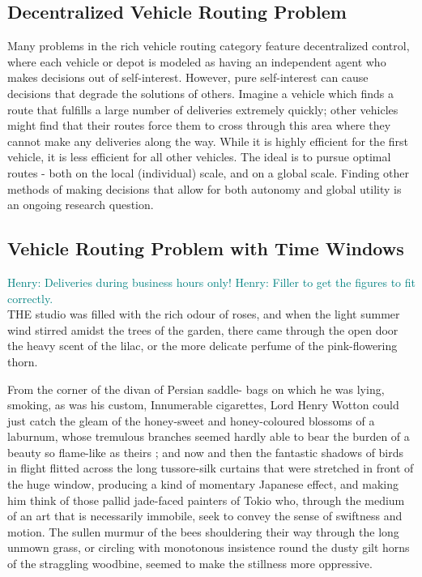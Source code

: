 \documentclass{sig-alternate}
\newcommand{\allcomments}[1]{{#1}}
\newcommand{\hfcomment}[1]{\textcolor{Teal}{\allcomments{Henry: {#1}}}}
\begin{document}
{\subsection{Decentralized Vehicle Routing Problem}
Many problems in the rich vehicle routing category feature decentralized control\cite{Caceres-Cruz:2014}, where each vehicle or depot is modeled as having an independent agent who makes decisions out of self-interest. However, pure self-interest can cause decisions that degrade the solutions of others. Imagine a vehicle which finds a route that fulfills a large number of deliveries extremely quickly; other vehicles might find that their routes force them to cross through this area where they cannot make any deliveries along the way. While it is highly efficient for the first vehicle, it is less efficient for all other vehicles. The ideal is to pursue optimal routes - both on the local (individual) scale, and on a global scale. Finding other methods of making decisions that allow for both autonomy and global utility is an ongoing research question. 
\subsection{Vehicle Routing Problem with Time Windows}
\hfcomment{Deliveries during business hours only!}
\hfcomment{Filler to get the figures to fit correctly.}\\
THE studio was filled with the rich odour of roses, 
and when the light summer wind stirred amidst 
the trees of the garden, there came through the open 
door the heavy scent of the lilac, or the more delicate 
perfume of the pink-flowering thorn. 

From the corner of the divan of Persian saddle- 
bags on which he was lying, smoking, as was his 
custom, Innumerable cigarettes, Lord Henry Wotton 
could just catch the gleam of the honey-sweet and 
honey-coloured blossoms of a laburnum, whose 
tremulous branches seemed hardly able to bear the 
burden of a beauty so flame-like as theirs ; and 
now and then the fantastic shadows of birds in 
flight flitted across the long tussore-silk curtains 
that were stretched in front of the huge window, 
producing a kind of momentary Japanese effect, 
and making him think of those pallid jade-faced 
painters of Tokio who, through the medium of an 
art that is necessarily immobile, seek to convey the 
sense of swiftness and motion. The sullen murmur 
of the bees shouldering their way through the long 
unmown grass, or circling with monotonous insistence 
round the dusty gilt horns of the straggling woodbine, 
seemed to make the stillness more oppressive.
}
\end{document}
